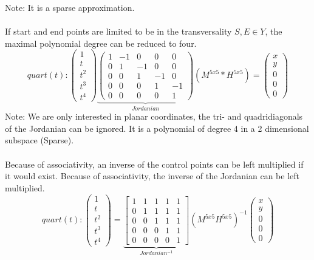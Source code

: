 \documentclass[a4paper,portrait]{report}
\begin{document}
Note: It is a sparse approximation.\\\\
If start and end points are limited to be in the transversality $S,E \in Y$, the maximal polynomial degree can be reduced to four.
\begin{equation}
quart(t):
\begin{pmatrix}
1 \\ t \\ t^2 \\ t^3 \\ t^4
\end{pmatrix}
\underbrace{\begin{pmatrix}
1 & -1 & 0 & 0 & 0\\
0 & 1 & -1 & 0 & 0\\
0 & 0 &1 & -1 & 0\\
0 & 0 & 0 & 1 & -1\\
0 & 0 & 0 & 0 & 1
\end{pmatrix}}_{Jordanian}
(M^{5x5}*H^{5x5})
=
\begin{pmatrix}
x \\ y \\ 0 \\ 0 \\ 0
\end{pmatrix}
\end{equation}
Note: We are only interested in planar coordinates, the tri- and quadridiagonals of the Jordanian can be ignored. It is a polynomial of degree 4 in a 2 dimensional subspace (Sparse).\\\\
Because of associativity, an inverse of the control points can be left multiplied if it would exist. Because of associativity, the inverse of the Jordanian can be left multiplied.
\begin{equation}
quart(t):
\begin{pmatrix}
1 \\ t \\ t^2 \\ t^3 \\ t^4
\end{pmatrix}
=
\underbrace{\begin{bmatrix}
1 & 1 & 1 & 1 & 1\\
0 & 1 & 1 & 1 & 1\\
0 & 0 & 1 & 1 & 1\\
0 & 0 & 0 & 1 & 1\\
0 & 0 & 0 & 0 & 1
\end{bmatrix}}_{Jordanian^{-1}}
(M^{5x5}H^{5x5})^{-1}
\begin{pmatrix}
x \\ y \\ 0 \\ 0 \\ 0
\end{pmatrix}
\end{equation}
\end{document}
